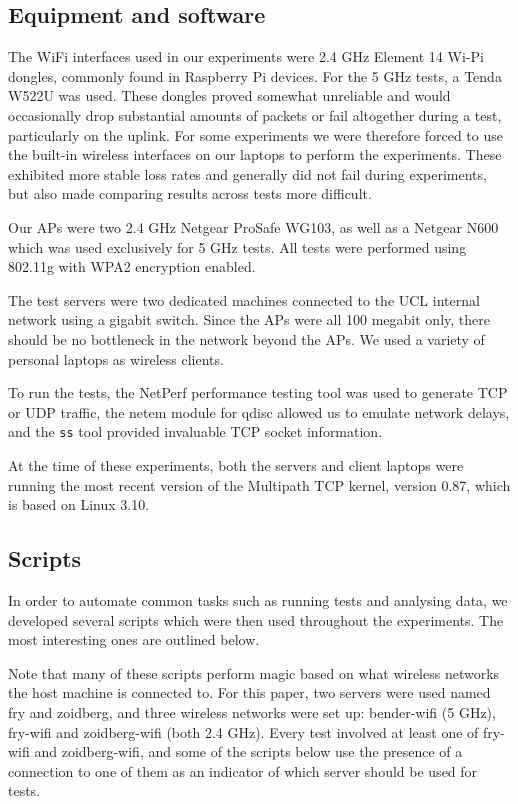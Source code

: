 \subsection{Equipment and software}
\label{sec:met:equip}
The WiFi interfaces used in our experiments were 2.4 GHz Element 14 Wi-Pi dongles,
commonly found in Raspberry Pi devices. For the 5 GHz tests, a
Tenda W522U was used. These dongles proved somewhat unreliable and would
occasionally drop substantial amounts of packets or fail altogether during a
test, particularly on the uplink. For some experiments we were therefore forced
to use the built-in wireless interfaces on our laptops to perform the
experiments.  These exhibited more stable loss rates and generally did not fail
during experiments, but also made comparing results across tests more difficult.

Our APs were two 2.4 GHz Netgear ProSafe WG103, as well as a Netgear N600 which
was used exclusively for 5 GHz tests. All tests were performed using 802.11g with
WPA2 encryption enabled.

The test servers were two dedicated machines connected to the UCL internal
network using a gigabit switch. Since the APs were all 100 megabit only, there
should be no bottleneck in the network beyond the APs. We used a variety of
personal laptops as wireless clients.

To run the tests, the NetPerf performance testing tool was used to generate TCP
or UDP traffic, the netem module for qdisc allowed us to emulate network delays,
and the \texttt{ss} tool provided invaluable TCP socket information.

At the time of these experiments, both the servers and client laptops were
running the most recent version of the Multipath TCP kernel, version 0.87, which
is based on Linux 3.10.

\subsection{Scripts}
\label{sec:met:scripts}
In order to automate common tasks such as running tests and analysing data, we
developed several scripts which were then used throughout the experiments. The
most interesting ones are outlined below.

Note that many of these scripts perform magic based on what wireless networks
the host machine is connected to. For this paper, two servers were used named fry and
zoidberg, and three wireless networks were set up: bender-wifi (5 GHz), fry-wifi
and zoidberg-wifi (both 2.4 GHz). Every test involved at least one of fry-wifi and
zoidberg-wifi, and some of the scripts below use the presence of a connection to
one of them as an indicator of which server should be used for tests.

